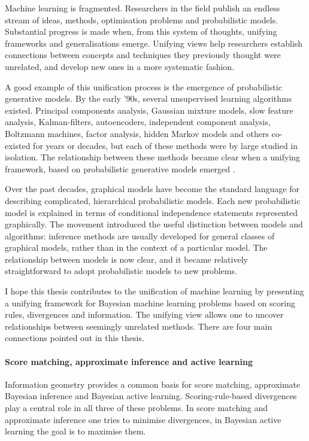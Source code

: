 
Machine learning is fragmented. Researchers in the field publish an endless stream of ideas, methods, optimisation problems and probabilistic models. Substantial progress is made when, from this system of thoughts, unifying frameworks and generalisations emerge. Unifying views help researchers establish connections between concepts and techniques they previously thought were unrelated, and develop new ones in a more systematic fashion.

A good example of this unification process is the emergence of probabilistic generative models. By the early '90s, several unsupervised learning algorithms existed. Principal components analysis, Gaussian mixture models, slow feature analysis, Kalman-filters, autoencoders, independent component analysis, Boltzmann machines, factor analysis, hidden Markov models and others co-existed for years or decades, but each of these methods were by large studied in isolation. The relationship between these methods became clear when a unifying framework, based on probabilistic generative models emerged \citep{Lauritzen1996,Roweis1999,Tipping1999,Turner2007}.

Over the past decades, graphical models \citep{Lauritzen1996} have become the standard language for describing complicated, hierarchical probabilistic models. Each new probabilistic model is explained in terms of conditional independence statements represented graphically. The movement introduced the useful distinction between models and algorithms: inference methods are usually developed for general classes of graphical models, rather than in the context of a particular model. The relationship between models is now clear, and it became relatively straightforward to adopt probabilistic models to new problems.	

I hope this thesis contributes to the unification of machine learning by presenting a unifying framework for Bayesian machine learning problems based on scoring rules, divergences and information. The unifying view allows one to uncover relationships between seemingly unrelated methods. There are four main connections pointed out in this thesis.

\paragraph{Score matching, approximate inference and active learning} Information geometry provides a common basis for score matching, approximate Bayesian inference and Bayesian active learning. Scoring-rule-based divergences play a central role in all three of these problems. In score matching and approximate inference one tries to minimise divergences, in Bayesian active learning the goal is to maximise them.

